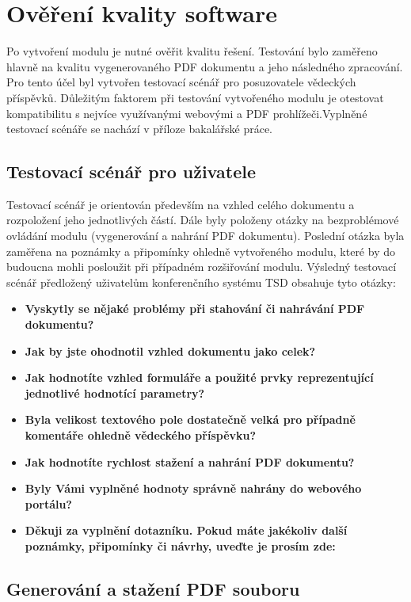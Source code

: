 \chapter{Ověření kvality software}
Po vytvoření modulu je nutné ověřit kvalitu řešení. Testování bylo zaměřeno hlavně na kvalitu vygenerovaného PDF dokumentu a jeho následného zpracování. Pro tento účel byl vytvořen testovací scénář pro posuzovatele vědeckých příspěvků. Důležitým faktorem při testování vytvořeného modulu je otestovat kompatibilitu s nejvíce využívanými webovými a PDF prohlížeči.Vyplněné testovací scénáře se nachází v příloze bakalářské práce.

\section{Testovací scénář pro uživatele}
Testovací scénář je orientován především na vzhled celého dokumentu a rozpoložení jeho jednotlivých částí. Dále byly položeny otázky na bezproblémové ovládání modulu (vygenerování a nahrání PDF dokumentu). Poslední otázka byla zaměřena na poznámky a připomínky ohledně vytvořeného modulu, které by do budoucna mohli posloužit při případném rozšiřování modulu.
Výsledný testovací scénář předložený uživatelům konferenčního systému TSD obsahuje tyto otázky:
\begin{itemize}
	\item \textbf{Vyskytly se nějaké problémy při stahování či nahrávání PDF dokumentu?}
	\item \textbf{Jak by jste ohodnotil vzhled dokumentu jako celek?}
	\item \textbf{Jak hodnotíte vzhled formuláře a použité prvky reprezentující jednotlivé hodnotící parametry?}
	\item \textbf{Byla velikost textového pole dostatečně velká pro případně komentáře ohledně vědeckého příspěvku?}
	\item \textbf{Jak hodnotíte rychlost stažení a nahrání PDF dokumentu?} 
	\item \textbf{Byly Vámi vyplněné hodnoty správně nahrány do webového portálu?}
	\item \textbf{Děkuji za vyplnění dotazníku. Pokud máte jakékoliv další poznámky, připomínky či návrhy, uveďte je prosím zde:}
\end{itemize}

\section{Generování a stažení PDF souboru}

